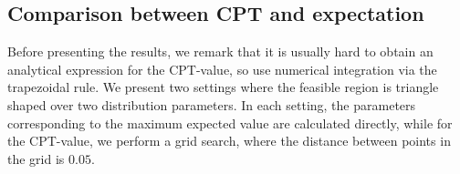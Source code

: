 \subsection{Comparison between CPT and expectation}
Before presenting the results, we remark that it is usually hard to obtain an analytical expression for the CPT-value, so  use numerical integration via the trapezoidal rule. 
We present two settings where the feasible region is triangle shaped over two distribution parameters. In each setting, the parameters corresponding to the maximum expected value are calculated directly, while for the CPT-value, we perform a grid search, where the distance between points in the grid is $0.05$. 
